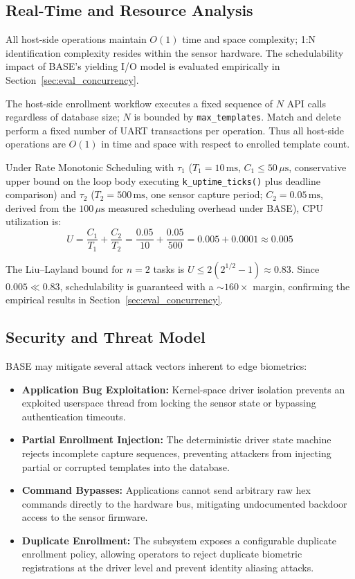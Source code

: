 \subsection{Real-Time and Resource Analysis}

All host-side operations maintain $O(1)$ time and space complexity; 1:N identification complexity resides within the sensor hardware. The schedulability impact of BASE's yielding I/O model is evaluated empirically in Section~\ref{sec:eval_concurrency}.

The host-side enrollment workflow executes a fixed sequence of $N$ API calls regardless of database size; $N$ is bounded by \texttt{max\_templates}. Match and delete perform a fixed number of UART transactions per operation. Thus all host-side operations are $O(1)$ in time and space with respect to enrolled template count.

Under Rate Monotonic Scheduling with $\tau_1$ ($T_1=10\,\text{ms}$, $C_1 \leq 50\,\mu\text{s}$, conservative upper bound on the loop body executing \texttt{k\_uptime\_ticks()} plus deadline comparison) and $\tau_2$ ($T_2=500\,\text{ms}$, one sensor capture period; $C_2=0.05\,\text{ms}$, derived from the $100\,\mu\text{s}$ measured scheduling overhead under BASE), CPU utilization is:
\begin{equation}
  U = \frac{C_1}{T_1} + \frac{C_2}{T_2}
    = \frac{0.05}{10} + \frac{0.05}{500}
    = 0.005 + 0.0001 \approx 0.005
\end{equation}

The Liu--Layland bound for $n=2$ tasks is $U \leq 2(2^{1/2}-1) \approx 0.83$. Since $0.005 \ll 0.83$, schedulability is guaranteed with a ${\sim}160\times$ margin, confirming the empirical results in Section~\ref{sec:eval_concurrency}.

\subsection{Security and Threat Model}
\label{sec:threat_model}
BASE may mitigate several attack vectors inherent to edge biometrics:
\begin{itemize}
    \item \textbf{Application Bug Exploitation:} Kernel-space driver isolation prevents an exploited userspace thread from locking the sensor state or bypassing authentication timeouts.
    \item \textbf{Partial Enrollment Injection:} The deterministic driver state machine rejects incomplete capture sequences, preventing attackers from injecting partial or corrupted templates into the database.
    \item \textbf{Command Bypasses:} Applications cannot send arbitrary raw hex commands directly to the hardware bus, mitigating undocumented backdoor access to the sensor firmware.
    \item \textbf{Duplicate Enrollment:} The subsystem exposes a configurable duplicate enrollment policy, allowing operators to reject duplicate biometric registrations at the driver level and prevent identity aliasing attacks.
\end{itemize}

